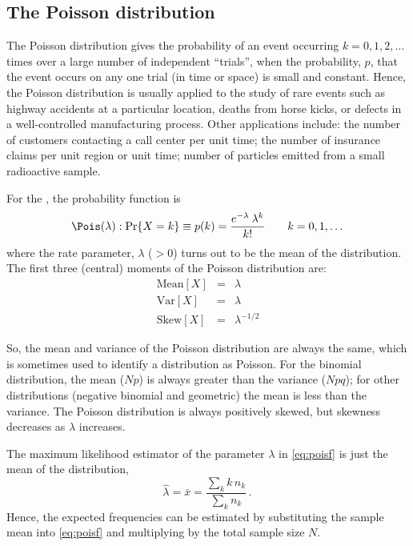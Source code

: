 \documentclass[11pt]{book}
\begin{document}

\subsection{The Poisson distribution}\label{sec:poisson}

The Poisson distribution gives the probability of an event occurring
$k = 0, 1, 2, \dots$ times over a large number of independent ``trials'',
when the probability, $p$, that the event occurs on any one
trial (in time or space) is small and constant.
Hence, the Poisson distribution is usually applied to the study of
rare events such as highway accidents at a particular location,
deaths from horse kicks, or defects in a well-controlled manufacturing
process.  Other applications include:
the number of customers contacting a call center per unit time;
the number of insurance claims per unit region or unit time;
number of particles emitted from a small radioactive sample.

For the , the probability function
is
\begin{equation}\label{eq:poisf}
\Pois(\lambda):\Pr \{ X = k \} \equiv p (k)=
  \frac{ e^{ - \lambda } \:  \lambda^k } { k ! }
  \quad\quad k = 0, 1, \dots
\end{equation}
where the rate parameter, $\lambda$ ($>0$) turns out to be the mean of the
distribution.
The first three (central) moments of the Poisson distribution are:
\begin{eqnarray*}
\textrm{Mean}[X] & = & \lambda \\
\textrm{Var}[X] &  = & \lambda \\
\textrm{Skew}[X] & = & \lambda^{- 1/2} 
\end{eqnarray*}

So, the mean and variance of the Poisson distribution are always
the same, which is sometimes used to identify a distribution
as Poisson.  For the binomial distribution, the mean ($Np$) is always
greater than the variance ($Npq$); for other distributions
(negative binomial and geometric) the mean is less than the
variance. The Poisson distribution is always positively skewed,
but skewness decreases as $\lambda$ increases.

The maximum likelihood estimator of the parameter \(\lambda\)
in \eqref{eq:poisf} is just
the mean of the distribution,
\begin{equation}
  \hat{\lambda}= \bar{x} = \frac{\sum_k k \,  n_k}{\sum_k  n_k} \label{eq:pois-lambda}
  \period
\end{equation}
Hence, the expected frequencies can be estimated by substituting the
sample mean into \eqref{eq:poisf} and multiplying by the total
sample size $N$.
\end{document}
